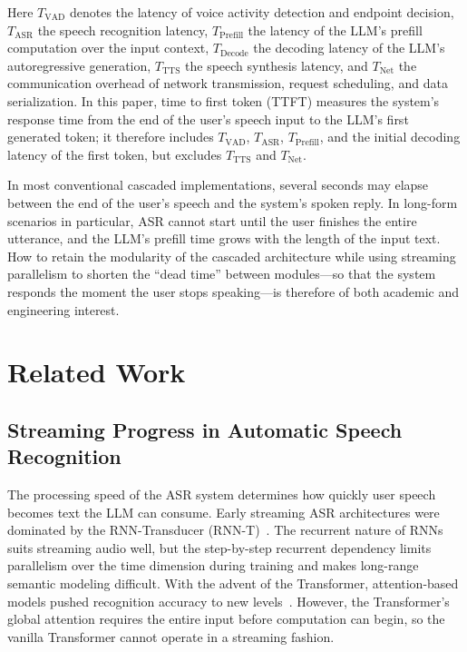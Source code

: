 \documentclass[pdflatex,iicol,Numbered,sn-basic]{sn-jnl}%
\begin{document}
Here $T_{\mathrm{VAD}}$ denotes the latency of voice activity detection and endpoint decision, $T_{\mathrm{ASR}}$ the speech recognition latency, $T_{\mathrm{Prefill}}$ the latency of the LLM's prefill computation over the input context, $T_{\mathrm{Decode}}$ the decoding latency of the LLM's autoregressive generation, $T_{\mathrm{TTS}}$ the speech synthesis latency, and $T_{\mathrm{Net}}$ the communication overhead of network transmission, request scheduling, and data serialization. In this paper, time to first token (TTFT) measures the system's response time from the end of the user's speech input to the LLM's first generated token; it therefore includes $T_{\mathrm{VAD}}$, $T_{\mathrm{ASR}}$, $T_{\mathrm{Prefill}}$, and the initial decoding latency of the first token, but excludes $T_{\mathrm{TTS}}$ and $T_{\mathrm{Net}}$.

In most conventional cascaded implementations, several seconds may elapse between the end of the user's speech and the system's spoken reply. In long-form scenarios in particular, ASR cannot start until the user finishes the entire utterance, and the LLM's prefill time grows with the length of the input text. How to retain the modularity of the cascaded architecture while using streaming parallelism to shorten the ``dead time'' between modules---so that the system responds the moment the user stops speaking---is therefore of both academic and engineering interest.

\section{Related Work}\label{sec:related}

\subsection{Streaming Progress in Automatic Speech Recognition}

The processing speed of the ASR system determines how quickly user speech becomes text the LLM can consume. Early streaming ASR architectures were dominated by the RNN-Transducer (RNN-T)~\cite{ref3}. The recurrent nature of RNNs suits streaming audio well, but the step-by-step recurrent dependency limits parallelism over the time dimension during training and makes long-range semantic modeling difficult. With the advent of the Transformer, attention-based models pushed recognition accuracy to new levels~\cite{ref4}. However, the Transformer's global attention requires the entire input before computation can begin, so the vanilla Transformer cannot operate in a streaming fashion.
\end{document}
